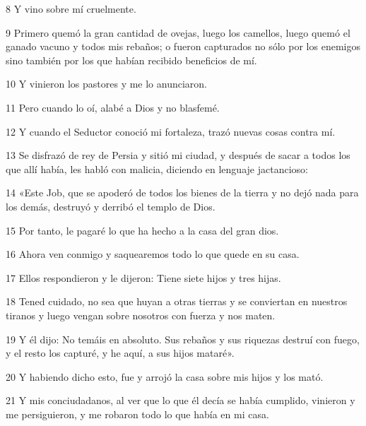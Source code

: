 \par 8 Y vino sobre mí cruelmente.

\par 9 Primero quemó la gran cantidad de ovejas, luego los camellos, luego quemó el ganado vacuno y todos mis rebaños; o fueron capturados no sólo por los enemigos sino también por los que habían recibido beneficios de mí.

\par 10 Y vinieron los pastores y me lo anunciaron.

\par 11 Pero cuando lo oí, alabé a Dios y no blasfemé.

\par 12 Y cuando el Seductor conoció mi fortaleza, trazó nuevas cosas contra mí.

\par 13 Se disfrazó de rey de Persia y sitió mi ciudad, y después de sacar a todos los que allí había, les habló con malicia, diciendo en lenguaje jactancioso:

\par 14 «Este Job, que se apoderó de todos los bienes de la tierra y no dejó nada para los demás, destruyó y derribó el templo de Dios.

\par 15 Por tanto, le pagaré lo que ha hecho a la casa del gran dios.

\par 16 Ahora ven conmigo y saquearemos todo lo que quede en su casa.

\par 17 Ellos respondieron y le dijeron: Tiene siete hijos y tres hijas.

\par 18 Tened cuidado, no sea que huyan a otras tierras y se conviertan en nuestros tiranos y luego vengan sobre nosotros con fuerza y ​​nos maten.

\par 19 Y él dijo: No temáis en absoluto. Sus rebaños y sus riquezas destruí con fuego, y el resto los capturé, y he aquí, a sus hijos mataré».

\par 20 Y habiendo dicho esto, fue y arrojó la casa sobre mis hijos y los mató.

\par 21 Y mis conciudadanos, al ver que lo que él decía se había cumplido, vinieron y me persiguieron, y me robaron todo lo que había en mi casa.

